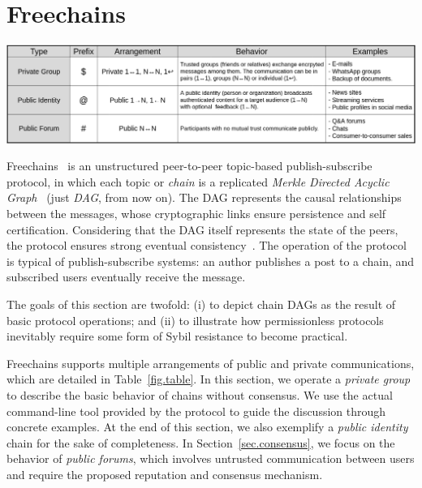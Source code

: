 \documentclass[12pt]{article}
\newcommand{\FC}       {Freechains\xspace}
\begin{document}

\section{\FC}
\label{sec.freechains}

\begin{table}
\centering
\includegraphics[width=\textwidth]{arrangements.png}
\caption{The three types of chains and arrangements in \FC.}
\label{fig.table}
\end{table}

\FC~\cite{fcs.sbseg20} is an unstructured peer-to-peer topic-based
publish-subscribe protocol, in which each topic or \emph{chain} is a replicated
\emph{Merkle Directed Acyclic Graph}~\cite{p2p.ipfs} (just \emph{DAG}, from now
on).
The DAG represents the causal relationships between the messages, whose
cryptographic links ensure persistence and self certification.
Considering that the DAG itself represents the state of the peers, the protocol
ensures strong eventual consistency~\cite{fed.matrix,p2p.byz}.
%
The operation of the protocol is typical of publish-subscribe systems: an
author publishes a post to a chain, and subscribed users eventually receive the
message.

The goals of this section are twofold:
    (i)  to depict chain DAGs as the result of basic protocol operations; and
    (ii) to illustrate how permissionless protocols inevitably require some
         form of Sybil resistance to become practical.

\FC supports multiple arrangements of public and private communications, which
are detailed in Table~\ref{fig.table}.
In this section, we operate a \emph{private group} to describe the basic
behavior of chains without consensus.
We use the actual command-line tool provided by the protocol to guide the
discussion through concrete examples.
At the end of this section, we also exemplify a \emph{public identity} chain
for the sake of completeness.
In Section~\ref{sec.consensus}, we focus on the behavior of \emph{public
forums}, which involves untrusted communication between users and require the
proposed reputation and consensus mechanism.
\end{document}
